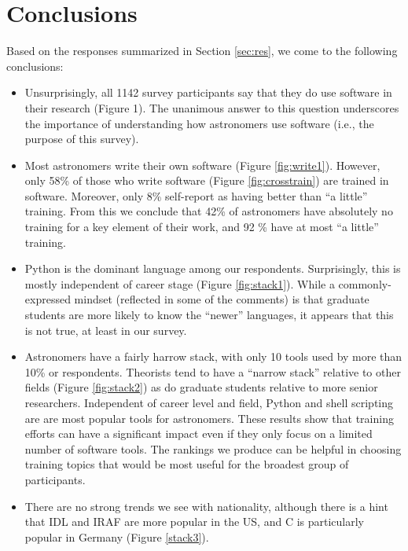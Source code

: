 
\section{Conclusions}
\label{sec:conc}


Based on the responses summarized in Section \ref{sec:res}, we come to the following conclusions:



\begin{itemize}
\item Unsurprisingly, all 1142 survey participants say that they do use software in their research (Figure 1). The unanimous answer to this question underscores the importance of understanding how astronomers use software (i.e., the purpose of this survey).
\item Most astronomers write their own software (Figure \ref{fig:write1}).  However, only 58\% of those who write software (Figure \ref{fig:crosstrain}) are trained in software.  Moreover, only 8\% self-report as having better than ``a little'' training.  From this we conclude that 42\% of astronomers have absolutely no training for a key element of their work, and 92 \% have at most ``a little'' training.  
\item Python is the dominant language among our respondents.  Surprisingly, this is mostly independent of career stage (Figure \ref{fig:stack1}).  While a commonly-expressed mindset (reflected in some of the comments) is that graduate students are more likely to know the ``newer'' languages, it appears that this is not true, at least in our survey.
\item Astronomers have a fairly harrow stack, with only 10 tools used by more than 10\% or respondents. Theorists tend to have a ``narrow stack'' relative to other fields (Figure \ref{fig:stack2}) as do graduate students relative to  more senior researchers. Independent of career level and field, Python and shell scripting are are most popular tools for astronomers. These results show that training efforts can have a significant impact even if they only focus on a limited number of software tools. The rankings we produce can be helpful in choosing training topics that would be most useful for the broadest group of participants. 
\item There are no strong trends we see with nationality, although there is a hint that IDL and IRAF are more popular in the US, and C is particularly popular in Germany (Figure \ref{stack3}).
\end{itemize}

